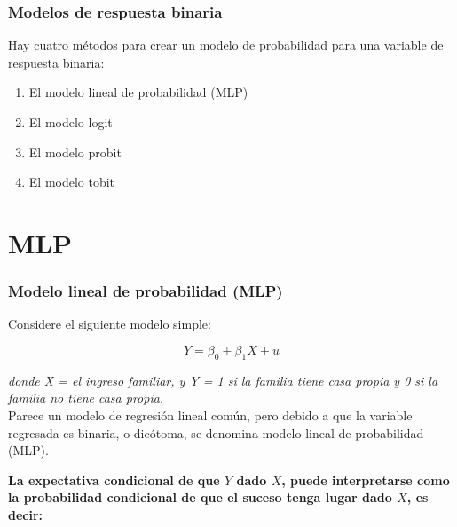 \documentclass[10pt]{beamer}
\begin{document}
\begin{frame}
\frametitle{Modelos de respuesta binaria}


Hay cuatro métodos para crear un modelo de probabilidad para una variable de respuesta binaria:

\begin{enumerate}
\item El modelo lineal de probabilidad (MLP)
\item El modelo logit
\item El modelo probit
\item El modelo tobit
\end{enumerate}


\end{frame}




\section{MLP}
\begin{frame}
\frametitle{Modelo lineal de probabilidad (MLP)}


Considere el siguiente modelo simple:

\begin{equation}
Y = \beta_0 +\beta_1 X + u
\end{equation}

\textit{donde X = el ingreso familiar, y Y = 1 si la familia tiene casa propia y 0 si la familia no tiene casa propia.}\\
\vspace{4mm}
Parece un modelo de regresión lineal común, pero debido a que la variable regresada es binaria, o dicótoma, se denomina modelo lineal de probabilidad (MLP).\\
\vspace{4mm}

\textbf{La expectativa condicional de que $Y$ dado $X$,  puede interpretarse como la probabilidad condicional de que el suceso tenga lugar dado $X$, es decir: 
}
\end{frame}


\end{document}
